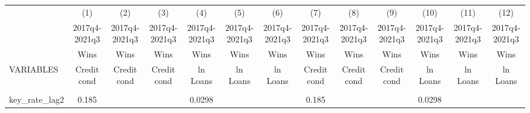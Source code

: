 \documentclass[]{article}
\begin{document}
\begin{center}
\begin{tabular}{lcccccccccccc} \hline
 & (1) & (2) & (3) & (4) & (5) & (6) & (7) & (8) & (9) & (10) & (11) & (12) \\
 & 2017q4-2021q3 & 2017q4-2021q3 & 2017q4-2021q3 & 2017q4-2021q3 & 2017q4-2021q3 & 2017q4-2021q3 & 2017q4-2021q3 & 2017q4-2021q3 & 2017q4-2021q3 & 2017q4-2021q3 & 2017q4-2021q3 & 2017q4-2021q3 \\
 & Wins & Wins & Wins & Wins & Wins & Wins & Wins & Wins & Wins & Wins & Wins & Wins \\
VARIABLES & Credit cond & Credit cond & Credit cond & ln Loans & ln Loans & ln Loans & Credit cond & Credit cond & Credit cond & ln Loans & ln Loans & ln Loans \\ \hline
\vspace{4pt} & \begin{footnotesize}\end{footnotesize} & \begin{footnotesize}\end{footnotesize} & \begin{footnotesize}\end{footnotesize} & \begin{footnotesize}\end{footnotesize} & \begin{footnotesize}\end{footnotesize} & \begin{footnotesize}\end{footnotesize} & \begin{footnotesize}\end{footnotesize} & \begin{footnotesize}\end{footnotesize} & \begin{footnotesize}\end{footnotesize} & \begin{footnotesize}\end{footnotesize} & \begin{footnotesize}\end{footnotesize} & \begin{footnotesize}\end{footnotesize} \\
key\_rate\_lag2 & 0.185 &  &  & 0.0298 &  &  & 0.185 &  &  & 0.0298 &  &  \\

\end{tabular}
\end{center}
\end{document}
